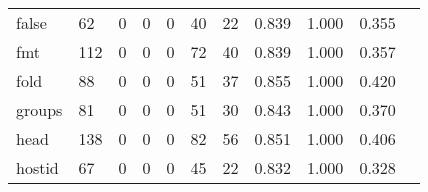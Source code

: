 \begin{longtable}{lp{1.2cm}p{1.2cm}p{1.2cm}p{1.2cm}p{1.2cm}p{1.2cm}p{1.2cm}p{1.2cm}p{1.2cm}p{1.2cm}}
false     &                                    62 &                                                  0 &                                                  0 &                                                  0 &                                                 40 &                                                 22 &                                              0.839 &                                              1.000 &                                              0.355 \\
fmt       &                                   112 &                                                  0 &                                                  0 &                                                  0 &                                                 72 &                                                 40 &                                              0.839 &                                              1.000 &                                              0.357 \\
fold      &                                    88 &                                                  0 &                                                  0 &                                                  0 &                                                 51 &                                                 37 &                                              0.855 &                                              1.000 &                                              0.420 \\
groups    &                                    81 &                                                  0 &                                                  0 &                                                  0 &                                                 51 &                                                 30 &                                              0.843 &                                              1.000 &                                              0.370 \\
head      &                                   138 &                                                  0 &                                                  0 &                                                  0 &                                                 82 &                                                 56 &                                              0.851 &                                              1.000 &                                              0.406 \\
hostid    &                                    67 &                                                  0 &                                                  0 &                                                  0 &                                                 45 &                                                 22 &                                              0.832 &                                              1.000 &                                              0.328 \\

\end{longtable}
